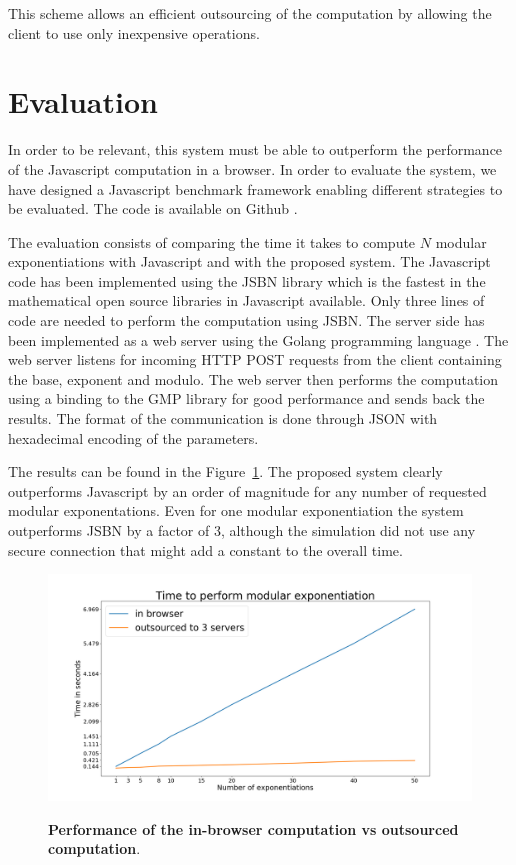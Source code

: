 \documentclass[]{article}
\begin{document}
This scheme allows an efficient outsourcing of the computation by allowing the
client to use only inexpensive operations.

\section{Evaluation} \label{evaluation}

In order to be relevant, this system must be able to outperform the performance
of the Javascript computation in a browser. In order to evaluate the system, we
have designed a Javascript benchmark framework enabling different strategies to be
evaluated. The code is available on Github \cite{code}.

The evaluation consists of comparing the time it takes to compute $N$ modular
exponentiations with Javascript and with the proposed system. The Javascript
code has been implemented using the JSBN library \cite{jsbn} which is the
fastest in the mathematical open source libraries in Javascript available. Only
three lines of code are needed to perform the computation using JSBN.  The
server side has been implemented as a web server using the Golang programming
language \cite{golang}. The web server listens for incoming HTTP POST requests
from the client containing the base, exponent and modulo.  The web server then
performs the computation using a binding to the GMP library \cite{gmplib} for
good performance and sends back the results. The format of the communication is
done through JSON with hexadecimal encoding of the parameters. 

The results can be found in the Figure~\ref{fig:system}. The proposed system clearly
outperforms Javascript by an order of magnitude for any number of requested
modular exponentations. Even for one modular exponentiation the system
outperforms JSBN by a factor of 3, although the simulation did not use any
secure connection that might add a constant to the overall time.

\begin{figure}[!htb]

    \centering

    \begin{center}
        \label{fig:system}
        \includegraphics[scale=0.25]{local_vs_split_50.png}
        \caption{\textbf{Performance of the in-browser computation vs
        outsourced computation}.}
    \end{center}

\end{figure}
\end{document}
